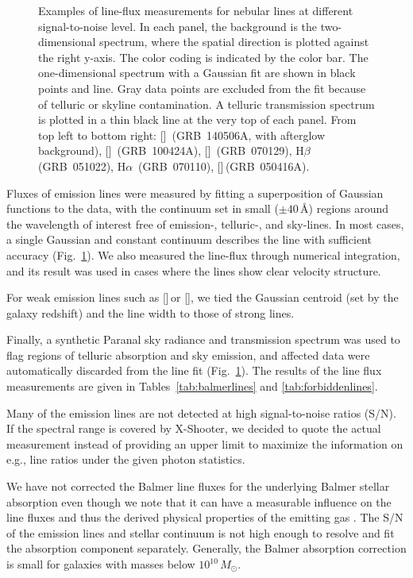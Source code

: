 \documentclass[traditabstract, longauth]{aa}
\newcommand{\hb}{H$\beta$}
\newcommand{\ha}{H$\alpha$}
\newcommand{\oii}{[\ion{O}{ii}]}
\newcommand{\oiii}{[\ion{O}{iii}]}
\newcommand{\neiii}{[\ion{Ne}{iii}]}
\newcommand{\nii}{[\ion{N}{ii}]}
\newcommand{\Msun}{$M_\odot$}
\begin{document}
\begin{figure}
\begin{subfigure}{.33\textwidth}
\end{subfigure}
\caption{ {Examples of line-flux measurements for nebular lines at different signal-to-noise level. In each panel, the background is the two-dimensional spectrum, where the spatial direction is plotted against the right y-axis. The color coding is indicated by the color bar. The one-dimensional spectrum with a Gaussian fit are shown in black points and line. Gray data points are excluded from the fit because of telluric or skyline contamination. A telluric transmission spectrum is plotted in a thin black line at the very top of each panel. From top left to bottom right: \oii\, (GRB~140506A, with afterglow background), \neiii\, (GRB~100424A), \oiii\, (GRB~070129), \hb\, (GRB~051022), \ha\, (GRB~070110), \nii\,(GRB~050416A).}}
\label{fig:lineexamples}
\end{figure}

Fluxes of emission lines were measured by fitting a superposition of Gaussian functions to the data, with the continuum set in small ($\pm40$\,\AA) regions around the wavelength of interest free of emission-, telluric-, and sky-lines. In most cases, a single Gaussian and constant continuum describes the line with sufficient accuracy (Fig.~\ref{fig:lineexamples}). We also measured the line-flux through numerical integration, and its result was used in cases where the lines show clear velocity structure.

For weak emission lines such as \neiii\,or \nii, we tied the Gaussian centroid (set by the galaxy redshift) and the line width to those of strong lines. 

Finally, a synthetic Paranal sky radiance and transmission spectrum \citep{2012A&A...543A..92N} was used to flag regions of telluric absorption and sky emission, and affected data were automatically discarded from the line fit (Fig.~\ref{fig:lineexamples}). The results of the line flux measurements are given in Tables~\ref{tab:balmerlines} and \ref{tab:forbiddenlines}. 

Many of the emission lines are not detected at high signal-to-noise ratios (S/N). If the spectral range is covered by X-Shooter, we decided to quote the actual measurement instead of providing an upper limit to maximize the information on e.g., line ratios under the given photon statistics.




We have not corrected the Balmer line fluxes for the underlying Balmer stellar absorption even though we note that it can have a measurable influence on the line fluxes and thus the derived physical properties of the emitting gas \citep{2011MNRAS.414.2793W}. The S/N of the emission lines and stellar continuum is not high enough to resolve and fit the absorption component separately. Generally, the Balmer absorption correction is small for galaxies with masses below $10^{10}$\,\Msun. 
\end{document}
